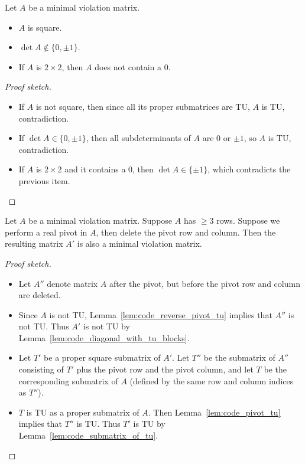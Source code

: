 \begin{lemma}
  \label{lem:code_mvm_props}
  Let $A$ be a minimal violation matrix.
  \begin{itemize}
    \item $A$ is square.
    \item $\det A \notin \{0, \pm 1\}$.
    \item If $A$ is $2 \times 2$, then $A$ does not contain a $0$.
  \end{itemize}
\end{lemma}

\begin{proof}[Proof sketch]
  \begin{itemize}
    \item If $A$ is not square, then since all its proper submatrices are TU, $A$ is TU, contradiction.
    \item If $\det A \in \{0, \pm 1\}$, then all subdeterminants of $A$ are $0$ or $\pm 1$, so $A$ is TU, contradiction.
    \item If $A$ is $2 \times 2$ and it contains a $0$, then $\det A \in \{\pm 1\}$, which contradicts the previous item.
  \end{itemize}
\end{proof}

\begin{lemma}
  \label{lem:code_mvm_pivot}
  Let $A$ be a minimal violation matrix. Suppose $A$ has $\geq 3$ rows.
  Suppose we perform a real pivot in $A$, then delete the pivot row and column.
  Then the resulting matrix $A'$ is also a minimal violation matrix.
\end{lemma}

\begin{proof}[Proof sketch]
  \begin{itemize}
    \item Let $A''$ denote matrix $A$ after the pivot, but before the pivot row and column are deleted.
    \item Since $A$ is not TU, Lemma~\ref{lem:code_reverse_pivot_tu} implies that $A''$ is not TU. Thus $A'$ is not TU by Lemma~\ref{lem:code_diagonal_with_tu_blocks}.
    \item Let $T'$ be a proper square submatrix of $A'$. Let $T''$ be the submatrix of $A''$ consisting of $T'$ plus the pivot row and the pivot column, and let $T$ be the corresponding submatrix of $A$ (defined by the same row and column indices as $T''$).
    \item $T$ is TU as a proper submatrix of $A$. Then Lemma~\ref{lem:code_pivot_tu} implies that $T''$ is TU. Thus $T'$ is TU by Lemma~\ref{lem:code_submatrix_of_tu}.
  \end{itemize}
\end{proof}
